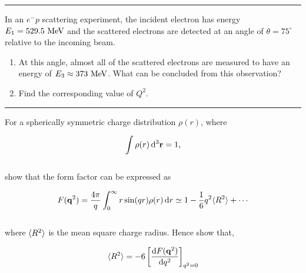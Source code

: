 \noindent\rule{7in}{1.5pt}


\begin{problem}{7.3}
    In an $e^-p$ scattering experiment, the incident electron has energy $E_1 = 529.5 \text{ MeV}$ and the scattered electrons are detected at an angle of $\theta = 75^\circ$ relative to the incoming beam.
    \begin{enumerate}[label=(\alph*)]
        \item At this angle, almost all of the scattered electrons are measured to have an energy of $E_3 \approx 373 \text{ MeV}$. What can be concluded from this observation?
        \item Find the corresponding value of $Q^2$.
    \end{enumerate}
\end{problem}
\begin{solution}

\end{solution}

\noindent\rule{7in}{1.5pt}


\begin{problem}{7.4}
    For a spherically symmetric charge distribution $\rho(r)$, where

    \begin{align*}
        \int \rho(r) \mathop{}\!\mathrm{d}^3 \mathbf{r} = 1,
    \end{align*}\\
    show that the form factor can be expressed as

    \begin{align*}
        F(\mathbf{q}^2) = \frac{4\pi}{q} \int^\infty_0 r \sin(qr) \rho(r) \mathop{}\!\mathrm{d} r \simeq 1 -\frac{1}{6}q^2\langle R^2 \rangle + \cdots
    \end{align*}\\
    where $\langle R^2 \rangle$  is the mean square charge radius. Hence show that,

    \begin{align*}
        \langle R^2 \rangle = -6 \left[ \frac{\mathop{}\!\mathrm{d} F(\mathbf{q}^2)}{\mathop{}\!\mathrm{d} q^2} \right]_{q^2=0}
    \end{align*}
\end{problem}
\begin{solution}

\end{solution}

